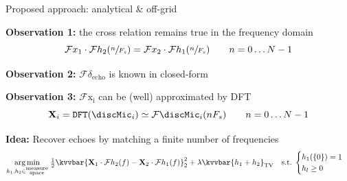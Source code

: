 \begin{frame}{Proposed approach: analytical \& off-grid \hfill\faJediOrder}

    \begin{block}{\textbf{Observation 1:} the cross relation remains true in the frequency domain}
        \begin{equation*}
            \mathcal{F}x_1 \cdot \mathcal{F}h_2 (\sfrac{n}{F_s}) = \mathcal{F}x_2 \cdot \mathcal{F}h_1(\sfrac{n}{F_s}) \qquad n=0\dots N-1
        \end{equation*}
        \end{block}

        \vspace{.5em}

        \pause
        \begin{block}{\textbf{Observation 2:} $\mathcal{F}\delta_{\mathrm{echo}}$ is known in closed-form}
        \end{block}

        \pause
        \vspace{1.em}
        \begin{block}{\textbf{Observation 3:} $\mathcal{F}{\mathrm{x_i}}$ can be (well) approximated by DFT}
        \begin{equation*}
            \mathbf{X}_i = \texttt{DFT}(\discMic_i) \simeq  \mathcal{F}{\discMic_i}(nF_s) \qquad n=0\dots N-1
        \end{equation*}
        \end{block}


        \pause
        \vfill
        \begin{block}{\textbf{Idea:} Recover echoes by matching a finite number of frequencies}
        \begin{equation*}
            \underset{h_1,h_2 \in \substack{\text{measure} \\ \text{space}}}{\arg\min} \;
            \tfrac{1}{2} \kvvbar{
                \mathbf{X}_1 \cdot \mathcal{F}h_2 (f) - \mathbf{X}_2 \cdot \mathcal{F}h_1(f)
            }_2^2
            + \lambda \kvvbar{h_1 + h_2}_{\mathrm{TV}}
            \quad
            \text{s.t.}\;
            \begin{cases}
                h_1(\{0\})=1 \\
                h_l \geq 0
                \end{cases}
        \end{equation*}
        \end{block}


\end{frame}
